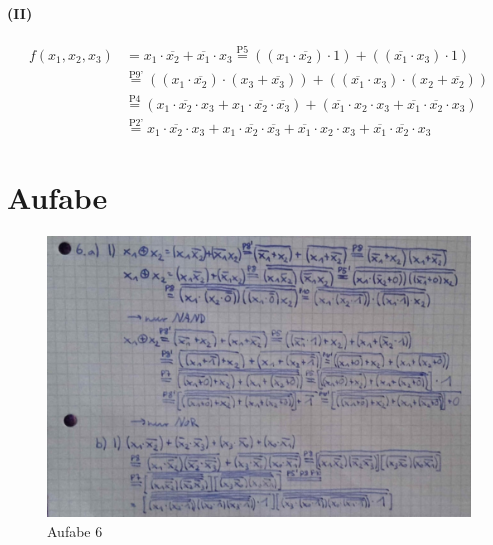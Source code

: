 \documentclass[a4paper]{article}
\begin{document}
\paragraph{(II)}
\begin{align*}
	f(x_1,x_2,x_3) &= x_1\cdot\overline{x_2} + \overline{x_1}\cdot x_3 \stackrel{\text{P5}}{=} ((x_1\cdot\overline{x_2})\cdot 1) + ((\overline{x_1}\cdot x_3)\cdot 1)\\
				   &\stackrel{\text{P9'}}{=} ((x_1\cdot\overline{x_2})\cdot(x_3+\overline{x_3})) + ((\overline{x_1}\cdot x_3)\cdot(x_2+\overline{x_2}))\\
				   &\stackrel{\text{P4}}{=} (x_1\cdot\overline{x_2}\cdot x_3 + x_1\cdot\overline{x_2}\cdot\overline{x_3}) + (\overline{x_1}\cdot x_2\cdot x_3 + \overline{x_1}\cdot\overline{x_2}\cdot x_3)\\
				   &\stackrel{\text{P2'}}{=} x_1\cdot\overline{x_2}\cdot x_3 + x_1\cdot\overline{x_2}\cdot\overline{x_3} + \overline{x_1}\cdot x_2\cdot x_3 + \overline{x_1}\cdot\overline{x_2}\cdot x_3
\end{align*}

\section{Aufabe}
\begin{figure}[H]
    \centering
    \includegraphics[width=\textwidth]{image.jpg}
    \caption{Aufabe 6}
\end{figure}
\end{document}
